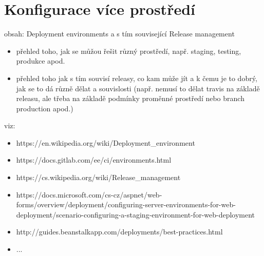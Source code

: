 \chapter{Konfigurace více prostředí}
obsah: Deployment environments a s tím související Release management


\begin{itemize}
\item přehled toho, jak se můžou řešit různý prostředí, např. staging, testing, produkce apod.
\end{itemize}
\begin{itemize}
\item přehled toho jak s tím souvisí releasy, co kam může jít a k čemu je to dobrý, jak se to dá různě dělat a souvislosti (např. nemusí to dělat travis na základě releasu, ale třeba na základě podmínky proměnné prostředí nebo branch production apod.)
\end{itemize}

viz:

\begin{itemize}
\item https://en.wikipedia.org/wiki/Deployment\_environment
\item https://docs.gitlab.com/ee/ci/environments.html
\item https://cs.wikipedia.org/wiki/Release\_management
\item https://docs.microsoft.com/cs-cz/aspnet/web-forms/overview/deployment/configuring-server-environments-for-web-deployment/scenario-configuring-a-staging-environment-for-web-deployment
\item http://guides.beanstalkapp.com/deployments/best-practices.html
\item ...
\end{itemize}

